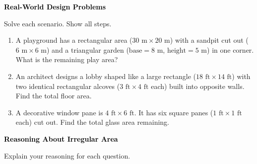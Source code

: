 \documentclass[12pt, letterpaper, fleqn]{article}
\begin{document}
\newpage

\begin{tcolorbox}[colback=black!10]
\large\textcolor{black}{\textbf{Real-World Design Problems}}
\end{tcolorbox}

\noindent
Solve each scenario. Show all steps.

\vspace{3mm}

\begin{enumerate}[itemsep=2.3cm, leftmargin=0.6cm]

\item A playground has a rectangular area ($30\text{ m} \times 20\text{ m}$) with a sandpit cut out ($6\text{ m} \times 6\text{ m}$) and a triangular garden ($\text{base} = 8\text{ m}$, $\text{height} = 5\text{ m}$) in one corner. What is the remaining play area?

\vspace{2.2cm}

\item An architect designs a lobby shaped like a large rectangle ($18\text{ ft} \times 14\text{ ft}$) with two identical rectangular alcoves ($3\text{ ft} \times 4\text{ ft}$ each) built into opposite walls. Find the total floor area.

\vspace{2.2cm}

\item A decorative window pane is $4\text{ ft} \times 6\text{ ft}$. It has six square panes ($1\text{ ft} \times 1\text{ ft}$ each) cut out. Find the total glass area remaining.

\vspace{2.5cm}

\end{enumerate}

\newpage

\begin{tcolorbox}[colback=black!10]
\large\textcolor{black}{\textbf{Reasoning About Irregular Area}}
\end{tcolorbox}

\noindent
Explain your reasoning for each question.

\vspace{3mm}
\end{document}
